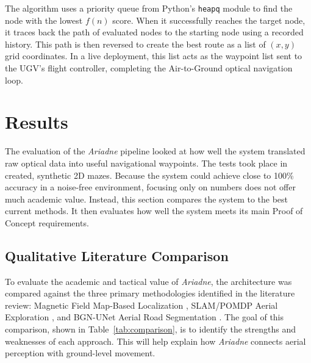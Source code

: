 \documentclass[12pt, a4paper]{article}
\begin{document}
\quad The algorithm uses a priority queue from Python's \texttt{heapq} module to find the node with the lowest $f(n)$ score. When it successfully reaches the target node, it traces back the path of evaluated nodes to the starting node using a recorded history. This path is then reversed to create the best route as a list of $(x, y)$ grid coordinates. In a live deployment, this list acts as the waypoint list sent to the UGV’s flight controller, completing the Air-to-Ground optical navigation loop.

\section{Results}

\quad The evaluation of the \textit{Ariadne} pipeline looked at how well the system translated raw optical data into useful navigational waypoints. The tests took place in created, synthetic 2D mazes. Because the system could achieve close to 100\% accuracy in a noise-free environment, focusing only on numbers does not offer much academic value. Instead, this section compares the system to the best current methods. It then evaluates how well the system meets its main Proof of Concept requirements.

\vspace{0.5cm}

\subsection{Qualitative Literature Comparison}

\quad To evaluate the academic and tactical value of \textit{Ariadne}, the architecture was compared against the three primary methodologies identified in the literature review: Magnetic Field Map-Based Localization \cite{11219502}, SLAM/POMDP Aerial Exploration \cite{8741612}, and BGN-UNet Aerial Road Segmentation \cite{Doghmane_Boukari_2024}. The goal of this comparison, shown in Table~\ref{tab:comparison}, is to identify the strengths and weaknesses of each approach. This will help explain how \textit{Ariadne} connects aerial perception with ground-level movement.
\end{document}
